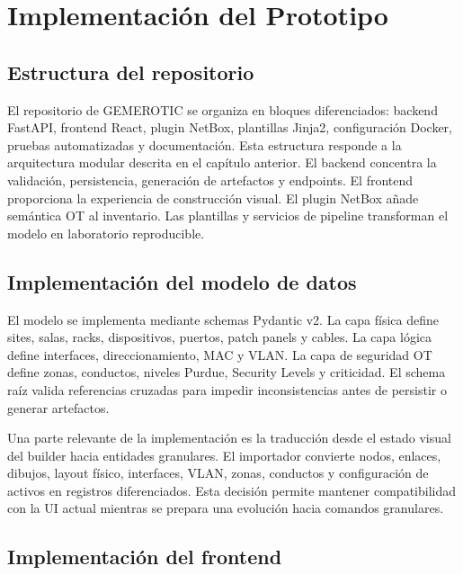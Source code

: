 \chapter{Implementación del Prototipo} \label{ch:implementacion}

\section{Estructura del repositorio} \label{sec:estructura-repositorio}

El repositorio de GEMEROTIC se organiza en bloques diferenciados: backend FastAPI, frontend React, plugin NetBox, plantillas Jinja2, configuración Docker, pruebas automatizadas y documentación. Esta estructura responde a la arquitectura modular descrita en el capítulo anterior. El backend concentra la validación, persistencia, generación de artefactos y endpoints. El frontend proporciona la experiencia de construcción visual. El plugin NetBox añade semántica OT al inventario. Las plantillas y servicios de pipeline transforman el modelo en laboratorio reproducible.

\section{Implementación del modelo de datos} \label{sec:implementacion-modelo}

El modelo se implementa mediante schemas Pydantic v2. La capa física define sites, salas, racks, dispositivos, puertos, patch panels y cables. La capa lógica define interfaces, direccionamiento, MAC y VLAN. La capa de seguridad OT define zonas, conductos, niveles Purdue, Security Levels y criticidad. El schema raíz valida referencias cruzadas para impedir inconsistencias antes de persistir o generar artefactos.

Una parte relevante de la implementación es la traducción desde el estado visual del builder hacia entidades granulares. El importador convierte nodos, enlaces, dibujos, layout físico, interfaces, VLAN, zonas, conductos y configuración de activos en registros diferenciados. Esta decisión permite mantener compatibilidad con la UI actual mientras se prepara una evolución hacia comandos granulares.

\section{Implementación del frontend} \label{sec:implementacion-frontend}

